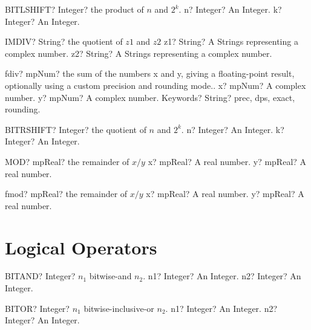 \documentclass[12pt,a4paper,openany]{book}
\begin{document}
\begin{mpFunctionsExtract}
\mpWorksheetFunctionTwoNotImplemented
{BITLSHIFT? Integer? the product of $n$ and $2^k$.}
{n? Integer? An Integer.}
{k? Integer? An Integer.}
\end{mpFunctionsExtract}

\begin{mpFunctionsExtract}
\mpWorksheetFunctionTwoNotImplemented
{IMDIV? String? the quotient of $z1$ and $z2$}
{z1? String? A Strings representing a complex number.}
{z2? String? A Strings representing a complex number.}
\end{mpFunctionsExtract}

\begin{mpFunctionsExtract}
\mpFunctionThree
{fdiv? mpNum? the sum of the numbers x and y, giving a floating-point result, optionally using a custom precision and rounding mode..}
{x? mpNum? A complex number.}
{y? mpNum? A complex number.}
{Keywords? String? prec, dps, exact, rounding.}
\end{mpFunctionsExtract}

\begin{mpFunctionsExtract}
\mpWorksheetFunctionTwoNotImplemented
{BITRSHIFT? Integer? the quotient of $n$ and $2^k$.}
{n? Integer? An Integer.}
{k? Integer? An Integer.}
\end{mpFunctionsExtract}

\begin{mpFunctionsExtract}
\mpWorksheetFunctionTwoNotImplemented
{MOD? mpReal? the remainder of $x/y$}
{x? mpReal? A real number.}
{y? mpReal? A real number.}
\end{mpFunctionsExtract}

\begin{mpFunctionsExtract}
\mpFunctionTwo
{fmod? mpReal? the remainder of $x/y$}
{x? mpReal? A real number.}
{y? mpReal? A real number.}
\end{mpFunctionsExtract}

\section{Logical Operators }

\begin{mpFunctionsExtract}
\mpWorksheetFunctionTwoNotImplemented
{BITAND? Integer? $n_1$ bitwise-and $n_2$.}
{n1? Integer? An Integer.}
{n2? Integer? An Integer.}
\end{mpFunctionsExtract}

\begin{mpFunctionsExtract}
\mpWorksheetFunctionTwoNotImplemented
{BITOR? Integer? $n_1$ bitwise-inclusive-or $n_2$.}
{n1? Integer? An Integer.}
{n2? Integer? An Integer.}
\end{mpFunctionsExtract}
\end{document}
